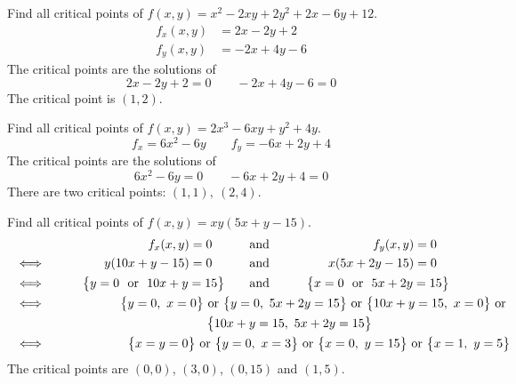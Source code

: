 \begin{eg}[$f(x,y)=x^2-2xy+2y^2+2x-6y+12$]\label{eg:MXMNlocalA}
Find all critical points of $f(x,y)=x^2-2xy+2y^2+2x-6y+12$.
\soln
\begin{align*}
f_x(x,y)&= 2x-2y+2 \\
f_y(x,y)&= -2x+4y-6
\end{align*}
The critical points are the solutions of %
\begin{equation*}
2x-2y+2=0\qquad -2x+4y-6=0
\end{equation*}
The critical point is $(1,2)$.
\end{eg}
\begin{eg}[$f(x,y)=2x^3 - 6xy + y^2 +4y $]\label{eg:MXMNlocalB}
Find all critical points of $f(x,y)=2x^3 - 6xy + y^2 +4y $.
\soln
\begin{equation*}
f_x=6x^2-6y   \qquad
f_y=-6x+2y+4
\end{equation*}
The critical points are the solutions of
\begin{equation*}
6x^2-6y=0   \qquad
-6x+2y+4 = 0
\end{equation*}
There are two critical points: $(1,1),\ (2,4)$.
\end{eg}
\begin{eg}[$f(x,y) = xy(5x+y-15)$]\label{eg:MXMNlocalC}
Find all critical points of $f(x,y)=xy(5x+y-15) $.
\soln
\begin{alignat*}{3}
&           &f_x(x,y)=0\quad\qquad
& \text{and}\qquad
& f_y(x,y)=0\quad \\
& \iff\qquad          &y(10x+y-15)=0\quad\qquad
& \text{and}\qquad
& x(5x+2y-15)=0\quad \\
&\iff\qquad & \big\{y=0\text{\ \  or\ \  }10x+y=15\big\}\qquad
& \text{and}\qquad
&\big\{x=0\text{\ \ or\ \ }5x+2y=15\big\}\\
&\iff\qquad & \big\{y=0,\ x=0\big\}\text{ or }
\big\{y=0,\ 5x+2y=15\big\}\text{ or }
\big\{10x+y=15,\ x=0\big\}\text{ or }\hskip-2.9in \\
\hskip1in \big\{10x+y=15,\ 5x+2y=15\big\}\hskip-4in\\
&\iff\qquad & \big\{x=y=0\big\}\text{ or }
\big\{y=0,\ x=3\big\}\text{ or }
\big\{x=0,\ y=15\big\}\text{ or }
\big\{x=1,\ y=5\big\}\hskip-2.9in
\end{alignat*}
The critical points are $(0,0)$, $(3,0)$, $(0,15)$ and $(1,5)$.
\end{eg}
